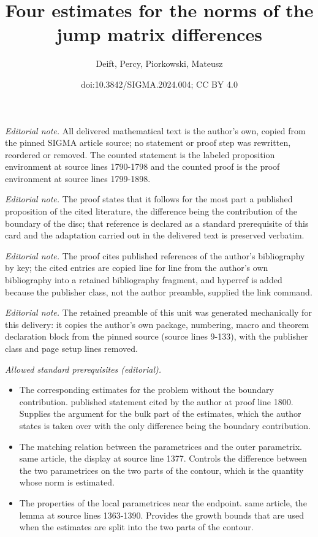 \documentclass[10pt,a4paper]{amsart}
\title{Four estimates for the norms of the jump matrix differences}
\author{Deift, Percy, Piorkowski, Mateusz}
\date{doi:10.3842/SIGMA.2024.004; CC BY 4.0}
\numberwithin{equation}{section}
\begin{document}
\maketitle
\setcounter{section}{7}
\setcounter{Theorem}{0}
\noindent\textit{Editorial note.} All delivered mathematical text is the author's own, copied from the pinned SIGMA article source; no statement or proof step was rewritten, reordered or removed. The counted statement is the labeled proposition environment at source lines 1790-1798 and the counted proof is the proof environment at source lines 1799-1898.\par\medskip
\noindent\textit{Editorial note.} The proof states that it follows for the most part a published proposition of the cited literature, the difference being the contribution of the boundary of the disc; that reference is declared as a standard prerequisite of this card and the adaptation carried out in the delivered text is preserved verbatim.\par\medskip
\noindent\textit{Editorial note.} The proof cites published references of the author's bibliography by key; the cited entries are copied line for line from the author's own bibliography into a retained bibliography fragment, and hyperref is added because the publisher class, not the author preamble, supplied the link command.\par\medskip
\noindent\textit{Editorial note.} The retained preamble of this unit was generated mechanically for this delivery: it copies the author's own package, numbering, macro and theorem declaration block from the pinned source (source lines 9-133), with the publisher class and page setup lines removed.\par\medskip
\noindent\textit{Allowed standard prerequisites (editorial).}\begin{itemize}
\item The corresponding estimates for the problem without the boundary contribution. published statement cited by the author at proof line 1800. Supplies the argument for the bulk part of the estimates, which the author states is taken over with the only difference being the boundary contribution.
\item The matching relation between the parametrices and the outer parametrix. same article, the display at source line 1377. Controls the difference between the two parametrices on the two parts of the contour, which is the quantity whose norm is estimated.
\item The properties of the local parametrices near the endpoint. same article, the lemma at source lines 1363-1390. Provides the growth bounds that are used when the estimates are split into the two parts of the contour.
\end{itemize}\medskip
\end{document}
